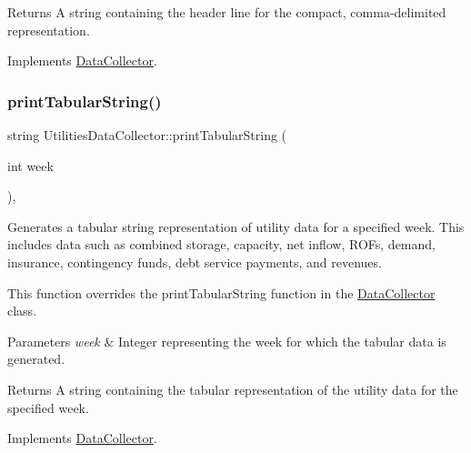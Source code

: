 \begin{DoxyReturn}{Returns}
A string containing the header line for the compact, comma-\/delimited representation. 
\end{DoxyReturn}


Implements \mbox{\hyperlink{classDataCollector_a98dcb4ec871d9c7fbf7545c64e5ccc67}{Data\+Collector}}.

\mbox{\label{classUtilitiesDataCollector_a39e7d28a70a0f71b3f1cc28b19c7e2d9}} 
\subsubsection{\texorpdfstring{print\+Tabular\+String()}{printTabularString()}}
{\footnotesize\ttfamily string Utilities\+Data\+Collector\+::print\+Tabular\+String (\begin{DoxyParamCaption}\item[{int}]{week }\end{DoxyParamCaption})\hspace{0.3cm}{\ttfamily [override]}, {\ttfamily [virtual]}}



Generates a tabular string representation of utility data for a specified week. This includes data such as combined storage, capacity, net inflow, R\+O\+Fs, demand, insurance, contingency funds, debt service payments, and revenues. 

This function overrides the {\ttfamily print\+Tabular\+String} function in the {\ttfamily \mbox{\hyperlink{classDataCollector}{Data\+Collector}}} class.


\begin{DoxyParams}{Parameters}
{\em week} & Integer representing the week for which the tabular data is generated.\\
\hline
\end{DoxyParams}
\begin{DoxyReturn}{Returns}
A string containing the tabular representation of the utility data for the specified week. 
\end{DoxyReturn}


Implements \mbox{\hyperlink{classDataCollector_a397fccabe0223267eea8fc7cac0e59da}{Data\+Collector}}.

